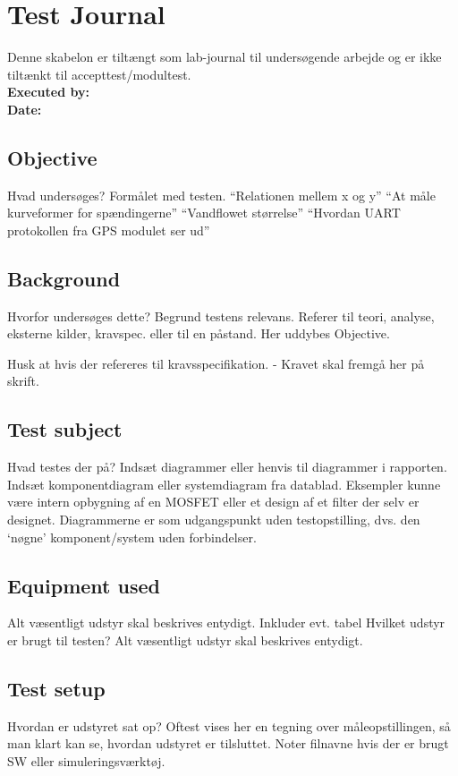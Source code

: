 \documentclass[reportMaster.tex]{subfiles}
\begin{document}
\chapter{Test Journal} \label{app:tj_1}

Denne skabelon er tiltængt som lab-journal til undersøgende arbejde og er ikke tiltænkt til accepttest/modultest.\\
\textbf{Executed by:} \\
\textbf{Date:}

\tocless\section{Objective}
Hvad undersøges? Formålet med testen. “Relationen mellem x og y” “At måle kurveformer for spændingerne” “Vandflowet størrelse” “Hvordan UART protokollen fra GPS modulet ser ud” 


\tocless\section{Background}
Hvorfor undersøges dette? Begrund testens relevans. Referer til teori, analyse, eksterne kilder, kravspec. eller til en påstand. Her uddybes Objective.


Husk at hvis der refereres til kravsspecifikation. - Kravet skal fremgå her på skrift.

\tocless\section{Test subject}
Hvad testes der på? Indsæt diagrammer eller henvis til diagrammer i rapporten. Indsæt komponentdiagram eller systemdiagram fra datablad. Eksempler kunne være intern opbygning af en MOSFET eller et design af et filter der selv er designet. Diagrammerne er som udgangspunkt uden testopstilling, dvs. den ‘nøgne’ komponent/system uden forbindelser. 


\tocless\section{Equipment used}
Alt væsentligt udstyr skal beskrives entydigt. Inkluder evt. tabel
Hvilket udstyr er brugt til testen? Alt væsentligt udstyr skal beskrives entydigt.

\tocless\section{Test setup}
Hvordan er udstyret sat op? Oftest vises her en tegning over måleopstillingen, så man klart kan se, hvordan udstyret er tilsluttet. Noter filnavne hvis der er brugt SW eller simuleringsværktøj.
\end{document}
